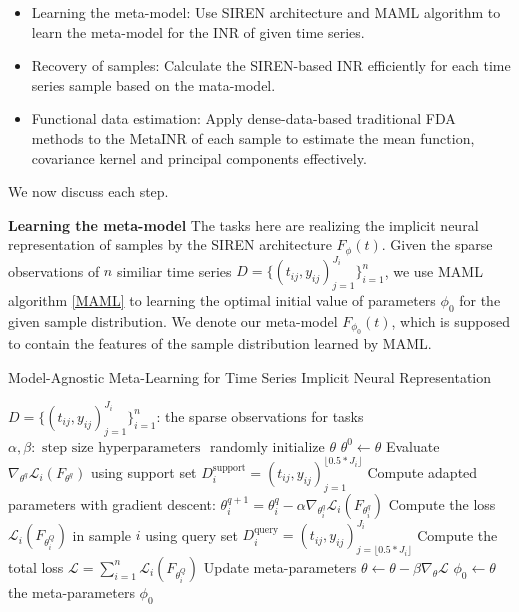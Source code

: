 \documentclass{article}
\begin{document}
\begin{itemize}
  \item Learning the meta-model: Use SIREN architecture and MAML algorithm to learn the meta-model for the INR of given time series.
  \item Recovery of samples: Calculate the SIREN-based INR efficiently for each time series sample based on the mata-model.
  \item Functional data estimation: Apply dense-data-based traditional FDA methods to the MetaINR of each sample to estimate the mean function, covariance kernel and principal components effectively.
\end{itemize}



We now discuss each step.

\textbf{Learning the meta-model}
The tasks here are realizing the implicit neural representation of samples by the SIREN architecture $F_\phi(t)$.
Given the sparse observations of $n$ similiar time series $D=\{(t_{ij},y_{ij})_{j=1}^{J_i}\}_{i=1}^n$,
we use MAML algorithm \ref{MAML} to learning the optimal initial value of parameters $\phi_0$ for the given sample distribution.
We denote our meta-model $F_{\phi_0}(t)$, which is supposed to contain the features of the sample distribution learned by MAML.


\begin{algorithm}[htb]
	\renewcommand{\algorithmicrequire}{\textbf{Input:}}
	\renewcommand{\algorithmicensure}{\textbf{Output:}}
	\caption{Model-Agnostic Meta-Learning for Time Series Implicit Neural Representation}
	\label{MAML}
	\begin{algorithmic}
    \REQUIRE $D=\{(t_{ij},y_{ij})_{j=1}^{J_i}\}_{i=1}^n$: the sparse observations for tasks
    \REQUIRE $\alpha, \beta: \text { step size hyperparameters }$
		\STATE randomly initialize $\theta$
        \STATE $\theta^0 \gets \theta$
          \STATE Evaluate $\nabla_{\theta^q} \mathcal{L}_{i}\left(F_{\theta^q}\right)$ using support set $D_i^{\text{support}}=(t_{ij},y_{ij})_{j=1}^{\lfloor 0.5*J_i\rfloor }$
          \STATE Compute adapted parameters with gradient descent:
          $\theta_i^{q+1}=\theta_i^q-\alpha \nabla_{\theta_i^q} \mathcal{L}_{i}\left(F_{\theta_i^q}\right)$
        \ENDFOR
        \STATE Compute the loss $\mathcal{L}_{i}\left(F_{\theta_i^Q}\right)$ in sample $i$ using query set $D_i^{\text{query}}=(t_{ij},y_{ij})_{j=\lfloor 0.5*J_i\rfloor }^{J_i}$
      \ENDFOR
      \STATE Compute the total loss $\mathcal{L} = \sum_{i=1}^n \mathcal{L}_{i}\left(F_{\theta_i^Q}\right)$
      \STATE Update meta-parameters $\theta \leftarrow \theta-\beta \nabla_\theta \mathcal{L} $
    \ENDWHILE 
    \STATE $\phi_0 \gets \theta$
		\ENSURE the meta-parameters $\phi_0$
  \end{algorithmic}  
\end{algorithm}
\end{document}
